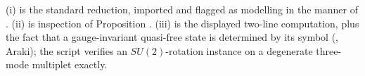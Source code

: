 (i) is the standard reduction, imported and flagged as modelling in the manner of \cite[Rem.~4.5]{ButlerT7}. (ii) is inspection of Proposition . (iii) is the displayed two-line computation, plus the fact that a gauge-invariant quasi-free state is determined by its symbol (\cite[Fact 3.3]{ButlerT7}, Araki); the script verifies an $SU(2)$-rotation instance on a degenerate three-mode multiplet exactly.
